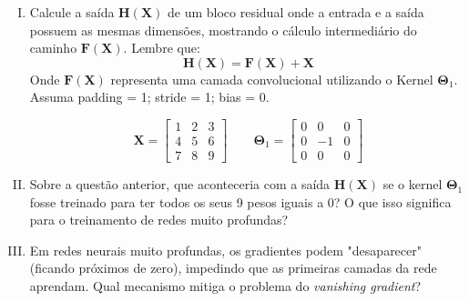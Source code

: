 \documentclass{dlproblemset}
\begin{document}
\begin{enumerate}[I)]
    \item Calcule a saída $\mathbf{H}(\mathbf{X})$ de um bloco residual onde a entrada e a saída possuem as mesmas dimensões, mostrando o cálculo intermediário do caminho $\mathbf{F}(\mathbf{X})$. Lembre que:
    \begin{equation}
        \mathbf{H}(\mathbf{X}) = \mathbf{F}(\mathbf{X}) + \mathbf{X}
    \end{equation}
    Onde $\mathbf{F}(\mathbf{X})$ representa uma camada convolucional utilizando o Kernel $\mathbf{\Theta}_1$. Assuma padding = 1; stride = 1; bias = 0.

    $$\mathbf{X} = \begin{bmatrix}
    1 & 2 & 3 \\
    4 & 5 & 6 \\
    7 & 8 & 9
    \end{bmatrix}
    \qquad
    \mathbf{\Theta}_1 = \begin{bmatrix}
    0 & 0 & 0 \\
    0 & -1 & 0 \\
    0 & 0 & 0
    \end{bmatrix}
    $$

    \item Sobre a questão anterior, que aconteceria com a saída $\mathbf{H}(\mathbf{X})$ se o kernel $\mathbf{\Theta}_1$ fosse treinado para ter todos os seus 9 pesos iguais a $0$? O que isso significa para o treinamento de redes muito profundas?

    \item Em redes neurais muito profundas, os gradientes podem "desaparecer" (ficando próximos de zero), impedindo que as primeiras camadas da rede aprendam. Qual mecanismo mitiga o problema do \textit{vanishing gradient}?


\end{enumerate}
\end{document}
